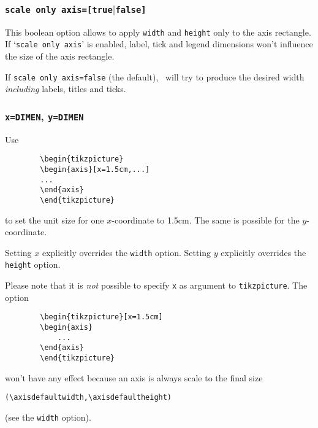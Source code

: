 \subsubsection{\texttt{scale only axis=[true$|$false]}}
This boolean option allows to apply \texttt{width} and \texttt{height} only to the axis rectangle. If `\texttt{scale only axis}' is enabled, label, tick and legend dimensions won't influence the size of the axis rectangle.

If \texttt{scale only axis=false} (the default), \PGFPlots\ will try to produce the desired width \emph{including} labels, titles and ticks.

\subsubsection{\texttt{x=DIMEN}, \texttt{y=DIMEN}}
Use
	\begin{lstlisting}
		\begin{tikzpicture}
		\begin{axis}[x=1.5cm,...]
		...
		\end{axis}
		\end{tikzpicture}
	\end{lstlisting}
	to set the unit size for one $x$-coordinate to 1.5cm. The same is possible for the $y$-coordinate.

	Setting $x$ explicitly overrides the \lstinline!width! option. Setting $y$ explicitly overrides the \lstinline!height! option.

	Please note that it is \emph{not} possible to specify \lstinline!x! as argument to \lstinline!tikzpicture!. The option 
	\begin{lstlisting}
		\begin{tikzpicture}[x=1.5cm]
		\begin{axis}
			...
		\end{axis}
		\end{tikzpicture}
	\end{lstlisting}
	won't have any effect because an axis is always scale to the final size 
	
	{\centering\lstinline!(\axisdefaultwidth,\axisdefaultheight)!
	
	}%
	\noindent
	(see the \lstinline!width! option).


